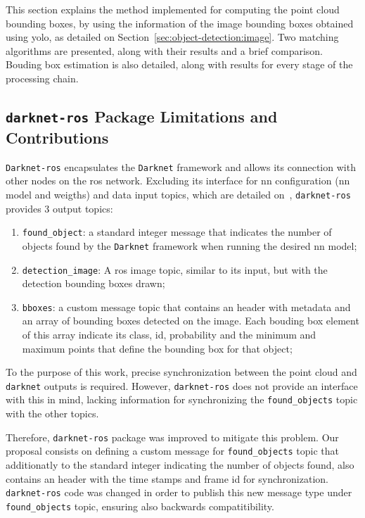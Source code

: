 This section explains the method implemented for computing the point cloud bounding boxes, by using the information of the image bounding boxes obtained using \ac{yolo}, as detailed on Section~\ref{sec:object-detection:image}. Two matching algorithms are presented, along with their results and a brief comparison. Bouding box estimation is also detailed, along with results for every stage of the processing chain.


\subsection{\texttt{darknet-ros} Package Limitations and Contributions}
\texttt{Darknet-ros} encapsulates the \texttt{Darknet} framework and allows its connection with other nodes on the \ac{ros} network. Excluding its interface for \ac{nn} configuration (\ac{nn} model and weigths) and data input topics, which are detailed on~\cite{MarkoBjelonic}, \texttt{darknet-ros} provides 3 output topics:

\begin{enumerate}
	\item \texttt{found\_object}: a standard integer message that indicates the number of objects found by the \texttt{Darknet} framework when running the desired \ac{nn} model;
	\item \texttt{detection\_image}: A \ac{ros} image topic, similar to its input, but with the detection bounding boxes drawn;
	\item \texttt{bboxes}: a custom message topic that contains an header with metadata and an array of bounding boxes detected on the image. Each bouding box element of this array indicate its class, id, probability and the minimum and maximum points that define the bounding box for that object;
\end{enumerate}

To the purpose of this work, precise synchronization between the point cloud and \texttt{darknet} outputs is required. However, \texttt{darknet-ros} does not provide an interface with this in mind, lacking information for synchronizing the \texttt{found\_objects} topic with the other topics.

Therefore, \texttt{darknet-ros} package was improved to mitigate this problem. Our proposal consists on defining a custom message for \texttt{found\_objects} topic that additionatly to the standard integer indicating the number of objects found, also contains an header with the time stamps and frame id for synchronization. \texttt{darknet-ros} code was changed in order to publish this new message type under \texttt{found\_objects} topic, ensuring also  backwards compatitibility.


